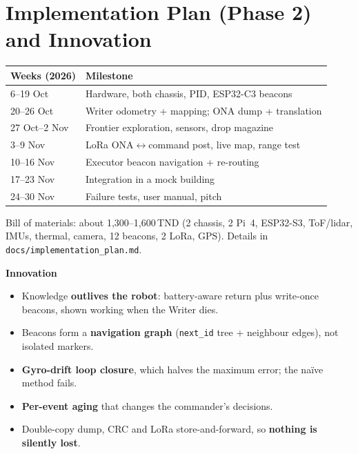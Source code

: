 \documentclass[10pt,a4paper]{article}
\newcommand{\tablesize}{\footnotesize}
\begin{document}
\section{Implementation Plan (Phase 2) and Innovation}
\begin{minipage}[t]{0.55\linewidth}\vspace{0pt}
{\tablesize
\begin{tabular}{@{}ll@{}}
\toprule
Weeks (2026) & Milestone\\\midrule
6–19 Oct & Hardware, both chassis, PID, ESP32-C3 beacons\\
20–26 Oct & Writer odometry + mapping; ONA dump + translation\\
27 Oct–2 Nov & Frontier exploration, sensors, drop magazine\\
3–9 Nov & LoRa ONA$\leftrightarrow$command post, live map, range test\\
10–16 Nov & Executor beacon navigation + re-routing\\
17–23 Nov & Integration in a mock building\\
24–30 Nov & Failure tests, user manual, pitch\\
\bottomrule
\end{tabular}}

\smallskip
Bill of materials: about 1,300–1,600\,TND (2 chassis, 2 Pi~4, ESP32-S3, ToF/lidar, IMUs, thermal, camera,
12 beacons, 2 LoRa, GPS). Details in \texttt{docs/implementation\_plan.md}.
\end{minipage}\hfill
\begin{minipage}[t]{0.42\linewidth}\vspace{0pt}
\textbf{Innovation}
\begin{itemize}
\item Knowledge \textbf{outlives the robot}: battery-aware return plus write-once beacons, shown working when the Writer dies.
\item Beacons form a \textbf{navigation graph} (\texttt{next\_id} tree + neighbour edges), not isolated markers.
\item \textbf{Gyro-drift loop closure}, which halves the maximum error; the naïve method fails.
\item \textbf{Per-event aging} that changes the commander's decisions.
\item Double-copy dump, CRC and LoRa store-and-forward, so \textbf{nothing is silently lost}.
\end{itemize}
\end{minipage}
\end{document}

